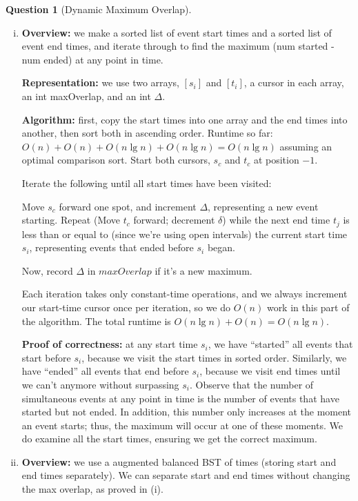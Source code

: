 \documentclass{article}
\newtheorem{ques}{Question}
\renewcommand{\b}[1]{\textbf{#1}}
\begin{document}
\begin{ques}[Dynamic Maximum Overlap]
\end{ques}
\begin{enumerate}[i.]
  \item %
  \b{Overview:} we make a sorted list of event start times and a sorted list of event end times, and iterate through to find the maximum (num started - num ended) at any point in time.

  \b{Representation:} we use two arrays, $[s_i]$ and $[t_i]$, a cursor in each array, an int maxOverlap, and an int $\Delta$.
  
  \b{Algorithm:} first, copy the start times into one array and the end times into another, then sort both in ascending order. Runtime so far: $O(n) + O(n) + O(n\lg n) + O(n\lg n) = O(n\lg n)$ assuming an optimal comparison sort. Start both cursors, $s_c$ and $t_c$ at position $-1$.

  Iterate the following until all start times have been visited:

  Move $s_c$ forward one spot, and increment $\Delta$, representing a new event starting. Repeat (Move $t_c$ forward; decrement $\delta$) while the next end time $t_j$ is less than or equal to (since we're using open intervals) the current start time $s_i$, representing events that ended before $s_i$ began.

  Now, record $\Delta$ in $maxOverlap$ if it's a new maximum.

  Each iteration takes only constant-time operations, and we always increment our start-time cursor once per iteration, so we do $O(n)$ work in this part of the algorithm. The total runtime is $O(n\lg n) + O(n) = O(n\lg n)$.

  \b{Proof of correctness:} at any start time $s_i$, we have ``started'' all events that start before $s_i$, because we visit the start times in sorted order. Similarly, we have ``ended'' all events that end before $s_i$, because we visit end times until we can't anymore without surpassing $s_i$. Observe that the number of simultaneous events at any point in time is the number of events that have started but not ended. In addition, this number only increases at the moment an event starts; thus, the maximum will occur at one of these moments. We do examine all the start times, ensuring we get the correct maximum.

  \item 
  \b{Overview:} we use a augmented balanced BST of times (storing start and end times separately). We can separate start and end times without changing the max overlap, as proved in (i).


\end{enumerate}
\end{document}
